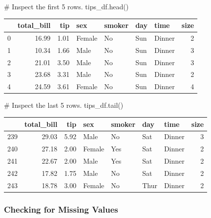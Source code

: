 \documentclass[
  letterpaper,
  DIV=11,
  numbers=noendperiod]{scrartcl}
\newenvironment{Shaded}{\begin{snugshade}}{\end{snugshade}}
\newcommand{\CommentTok}[1]{\textcolor[rgb]{0.37,0.37,0.37}{#1}}
\newcommand{\NormalTok}[1]{\textcolor[rgb]{0.00,0.46,0.62}{#1}}
\begin{document}
\begin{Shaded}
\begin{Highlighting}[]
\CommentTok{\# Inspect the first 5 rows.}
\NormalTok{tips\_df.head()}
\end{Highlighting}
\end{Shaded}

\begin{tabular}{lrrllllr}
\toprule
{} &  total\_bill &   tip &     sex & smoker &  day &    time &  size \\
\midrule
0 &       16.99 &  1.01 &  Female &     No &  Sun &  Dinner &     2 \\
1 &       10.34 &  1.66 &    Male &     No &  Sun &  Dinner &     3 \\
2 &       21.01 &  3.50 &    Male &     No &  Sun &  Dinner &     3 \\
3 &       23.68 &  3.31 &    Male &     No &  Sun &  Dinner &     2 \\
4 &       24.59 &  3.61 &  Female &     No &  Sun &  Dinner &     4 \\
\bottomrule
\end{tabular}

\begin{Shaded}
\begin{Highlighting}[]
\CommentTok{\# Inspect the last 5 rows.}
\NormalTok{tips\_df.tail()}
\end{Highlighting}
\end{Shaded}

\begin{tabular}{lrrllllr}
\toprule
{} &  total\_bill &   tip &     sex & smoker &   day &    time &  size \\
\midrule
239 &       29.03 &  5.92 &    Male &     No &   Sat &  Dinner &     3 \\
240 &       27.18 &  2.00 &  Female &    Yes &   Sat &  Dinner &     2 \\
241 &       22.67 &  2.00 &    Male &    Yes &   Sat &  Dinner &     2 \\
242 &       17.82 &  1.75 &    Male &     No &   Sat &  Dinner &     2 \\
243 &       18.78 &  3.00 &  Female &     No &  Thur &  Dinner &     2 \\
\bottomrule
\end{tabular}

\hypertarget{checking-for-missing-values}{%
\subsubsection{Checking for Missing
Values}\label{checking-for-missing-values}}
\end{document}
